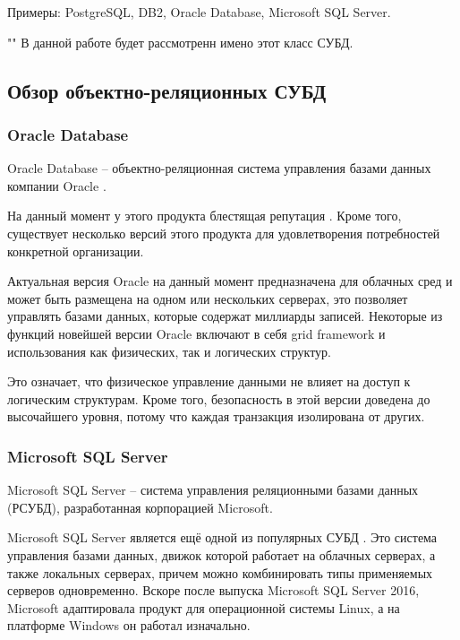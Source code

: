 \documentclass[a4paper,14pt]{extreport}
\begin{document}
Примеры: PostgreSQL, DB2, Oracle Database, Microsoft SQL Server.

""\newline\indent
В данной работе будет рассмотренн имено этот класс СУБД.

\subsection{Обзор объектно-реляционных СУБД}

\subsubsection*{Oracle Database}

Oracle Database \cite{orc_db} -- объектно-реляционная система управления базами данных компании Oracle \cite{orc}.

На данный момент у этого продукта блестящая репутация \cite{cmp_db}. Кроме того, существует несколько версий этого продукта для удовлетворения потребностей конкретной организации.

Актуальная версия Oracle на данный момент предназначена для облачных сред и может быть размещена на одном или нескольких серверах, это позволяет управлять базами данных, которые содержат миллиарды записей. Некоторые из функций новейшей версии Oracle включают в себя grid framework и использования как физических, так и логических структур.

Это означает, что физическое управление данными не влияет на доступ к логическим структурам. Кроме того, безопасность в этой версии доведена до высочайшего уровня, потому что каждая транзакция изолирована от других.

\subsubsection*{Microsoft SQL Server}

Microsoft SQL Server \cite{mssql} -- система управления реляционными базами данных (РСУБД), разработанная корпорацией Microsoft.

Microsoft SQL Server является ещё одной из популярных СУБД \cite{cmp_db}. Это система управления базами данных, движок которой работает на облачных серверах, а также локальных серверах, причем можно комбинировать типы применяемых серверов одновременно. Вскоре после выпуска Microsoft SQL Server 2016, Microsoft адаптировала продукт для операционной системы Linux, а на платформе Windows он работал изначально.
\end{document}

